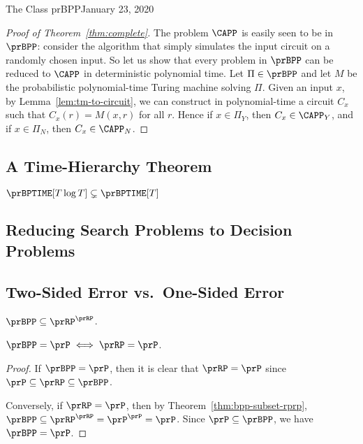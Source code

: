 \begin{lecture}{1}{The Class prBPP}{January 23, 2020}
\begin{proof}[Proof of Theorem~\ref{thm:complete}]
  The problem $\CAPP$ is easily seen to be in $\prBPP$: consider the algorithm
  that simply simulates the input circuit on a randomly chosen input. So let us
  show that every problem in $\prBPP$ can be reduced to $\CAPP$ in
  deterministic polynomial time. Let $\Pi \in \prBPP$ and let $M$ be the
  probabilistic polynomial-time Turing machine solving $\Pi$. Given an input
  $x$, by Lemma~\ref{lem:tm-to-circuit}, we can construct in polynomial-time a
  circuit $C_x$ such that $C_x(r) = M(x, r)$ for all $r$. Hence if $x \in
  \Pi_Y$, then $C_x \in \CAPP_Y$, and if $x \in \Pi_N$, then $C_x \in \CAPP_N$.
\end{proof}

\subsection{A Time-Hierarchy Theorem}

\begin{theorem}
  $\prBPTIME[T \log{T}] \subsetneq \prBPTIME[T]$
\end{theorem}


\subsection{Reducing Search Problems to Decision Problems}

\subsection{Two-Sided Error vs.\ One-Sided Error}

\begin{theorem}\label{thm:bpp-subset-rprp}
    $\prBPP \subseteq \prRP^\prRP$.
\end{theorem}


\begin{corollary}
    $\prBPP = \prP \iff \prRP = \prP$.
\end{corollary}

\begin{proof}
    If $\prBPP = \prP$, then it is clear that $\prRP = \prP$ since $\prP \subseteq
    \prRP \subseteq \prBPP$.

    Conversely, if $\prRP = \prP$, then by Theorem~\ref{thm:bpp-subset-rprp},
    $\prBPP \subseteq \prRP^\prRP = \prP^\prP = \prP$.
    Since $\prP \subseteq \prBPP$, we have $\prBPP = \prP$.
\end{proof}

\end{lecture}
